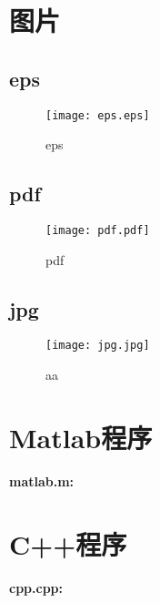 \documentclass[bwprint]{cumcmthesis}
\begin{document}
\section{图片}

\subsection{eps}

\begin{figure}[h]
	\centering
	\texttt{[image: eps.eps]}
	\caption{eps}
\end{figure}
\clearpage
\subsection{pdf}

\begin{figure}[h]
	\centering
	\texttt{[image: pdf.pdf]}
	\caption{pdf}
\end{figure}
\clearpage
\subsection{jpg}

\begin{figure}[h]
	\small
	\centering
	\texttt{[image: jpg.jpg]}
	\caption{aa}
\end{figure}
\clearpage


\nocite{*}


\newpage
\appendix
\section{Matlab程序}

\textcolor[rgb]{0.98,0.00,0.00}{\textbf{matlab.m:}}



\section{C++程序}

\textcolor[rgb]{0.98,0.00,0.00}{\textbf{cpp.cpp:}}


\end{document}
